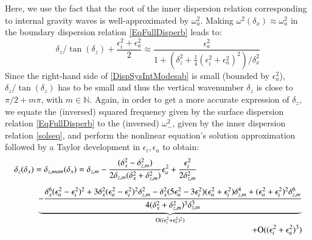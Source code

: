 Here, we use the fact that the root of the inner dispersion relation corresponding to internal gravity waves is well-approximated by $\omega_a^2$. Making $\omega^2(\delta_x) \approx\omega_a^2$ in the boundary dispersion relation \ref{EqFullDisperb} leads to:
\begin{equation}
\label{DispSysIntModesab}
\delta_z/\tan(\delta_z)+\frac{\epsilon_i^2+\epsilon_a^2}{2}
\approx
\frac{\epsilon_a^2}{1
	+\left(\delta_z^2+\frac{1}{4}\left(
	\epsilon_i^2+\epsilon_a^2\right)^2\right)/\delta_x^2}
\end{equation}
Since the right-hand side of \ref{DispSysIntModesab} is small (bounded by $\epsilon_a^2$), $\delta_z/\tan(\delta_z)$ has to be small and thus the vertical wavenumber $\delta_z$ is close to $\pi/2+m\pi$, with $m\in\mathbb{N}$.
%
Again, in order to get a more accurate expression of $\delta_z$, we equate the (inversed) squared frequency given by the surface dispersion relation \ref{EqFullDisperb} to the (inversed) $\omega_-^2$, given by the inner dispersion relation \ref{solseq}, and perform the nonlinear equation's solution approximation followed by a Taylor development in $\epsilon_i, \epsilon_a$ to obtain:
\begin{equation}
	\label{ParamallMAM1}
\begin{array}{l}
\displaystyle
\delta_{z}(\delta_x)=\delta_{z,mam}(\delta_x)=
\delta_{z,m}
-\frac{(\delta_x^2-\delta_{z,m}^2)}{2\delta_{z,m}(\delta_x^2+\delta_{z,m}^2)}\epsilon_a^2
+\frac{\epsilon_i^2}{
2\delta_{z,m}^2}
\\[5mm]
\hspace*{1cm}
\displaystyle
\underbrace{
-\frac{\delta_x^6(\epsilon_a^2-\epsilon_i^2)^2+3\delta_x^2(\epsilon_a^2-\epsilon_i^2)^2\delta_{z,m}^2-\delta_x^2(5\epsilon_a^2-3\epsilon_i^2)(\epsilon_a^2+\epsilon_i^2)\delta_{z,m}^4+(\epsilon_a^2+\epsilon_i^2)^2\delta_{z,m}^6}{4(\delta_x^2+\delta_{z,m}^2)^3\delta_{z,m}^3}
}_{\mathrm{O}	((\epsilon_i^2+\epsilon_a^2)^2)}
\\[5mm]
\hfill
\displaystyle
+\mathrm{O}	((\epsilon_i^2+\epsilon_a^2)^3)
\end{array}
\end{equation}
